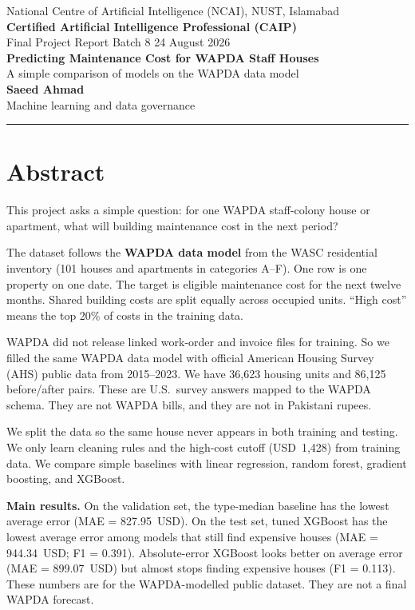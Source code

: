 \documentclass[11pt,a4paper]{article}
\begin{document}
\begin{center}
{\small National Centre of Artificial Intelligence (NCAI), NUST, Islamabad}\\[0.35em]
{\large\bfseries Certified Artificial Intelligence Professional (CAIP)}\\[0.15em]
{\small Final Project Report \textperiodcentered{} Batch 8 \textperiodcentered{} 24 August 2026}\\[0.7em]
{\LARGE\bfseries Predicting Maintenance Cost for WAPDA Staff Houses}\\[0.45em]
{\large A simple comparison of models on the WAPDA data model}\\[0.55em]
{\normalsize\textbf{Saeed Ahmad}}\\[0.15em]
{\small Machine learning and data governance}
\end{center}

\vspace{0.4em}
\noindent\rule{\textwidth}{0.4pt}

\section*{Abstract}
This project asks a simple question: for one WAPDA staff-colony house or apartment, what will building maintenance cost in the next period?

The dataset follows the \textbf{WAPDA data model} from the WASC residential inventory (101 houses and apartments in categories A--F). One row is one property on one date. The target is eligible maintenance cost for the next twelve months. Shared building costs are split equally across occupied units. ``High cost'' means the top 20\% of costs in the training data.

WAPDA did not release linked work-order and invoice files for training. So we filled the same WAPDA data model with official American Housing Survey (AHS) public data from 2015--2023. We have 36{,}623 housing units and 86{,}125 before/after pairs. These are U.S.\ survey answers mapped to the WAPDA schema. They are not WAPDA bills, and they are not in Pakistani rupees.

We split the data so the same house never appears in both training and testing. We only learn cleaning rules and the high-cost cutoff (USD~1{,}428) from training data. We compare simple baselines with linear regression, random forest, gradient boosting, and XGBoost.

\textbf{Main results.} On the validation set, the type-median baseline has the lowest average error (MAE = 827.95~USD). On the test set, tuned XGBoost has the lowest average error among models that still find expensive houses (MAE = 944.34~USD; F1 = 0.391). Absolute-error XGBoost looks better on average error (MAE = 899.07~USD) but almost stops finding expensive houses (F1 = 0.113). These numbers are for the WAPDA-modelled public dataset. They are not a final WAPDA forecast.
\end{document}

